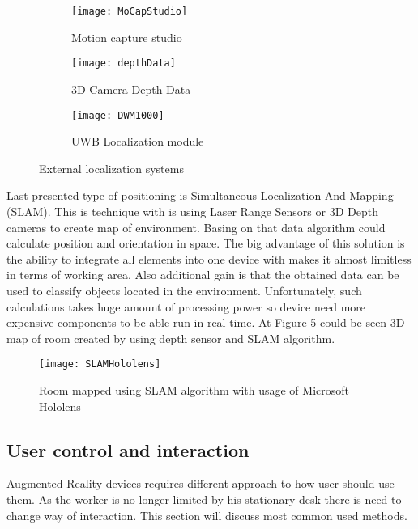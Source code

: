 \documentclass[printmode,en]{mgr}
\begin{document}
\begin{figure}[!ht]
\centering
\begin{subfigure}{.33\textwidth}
  \centering
  \texttt{[image: MoCapStudio]}
  \caption{Motion capture studio}
  \label{fig:MoCapStudio}
\end{subfigure}%
\begin{subfigure}{.33\textwidth}
  \centering
  \texttt{[image: depthData]}
  \caption{3D Camera Depth Data}
  \label{fig:depthData}
\end{subfigure}
\begin{subfigure}{.33\textwidth}
  \centering
  \texttt{[image: DWM1000]}
  \caption{UWB Localization module}
  \label{fig:DWM1000}
\end{subfigure}
\caption{External localization systems}
\label{fig:externalDevicesLocalization}
\end{figure}

Last presented type of positioning is Simultaneous Localization And Mapping (SLAM). This is technique with is using Laser Range Sensors or 3D Depth cameras to create map of environment. Basing on that data algorithm could calculate position and orientation in space. The big advantage of this solution is the ability to integrate all elements into one device with makes it almost limitless in terms of working area. Also additional gain is that the obtained data can be used to classify objects located in the environment. Unfortunately, such calculations takes huge amount of processing power so device need more expensive components to be able run in real-time. At Figure \ref{fig:SLAMHololens} could be seen 3D map of room created by using depth sensor and SLAM algorithm.

\begin{figure}[!ht]
  \centering
    \texttt{[image: SLAMHololens]}
  \caption{Room mapped using SLAM algorithm with usage of Microsoft Hololens}
  \label{fig:SLAMHololens}
\end{figure}

\subsection{User control and interaction}
Augmented Reality devices requires different approach to how user should use them. As the worker is no longer limited by his stationary desk there is need to change way of interaction. This section will discuss most common used methods.\\
\end{document}
